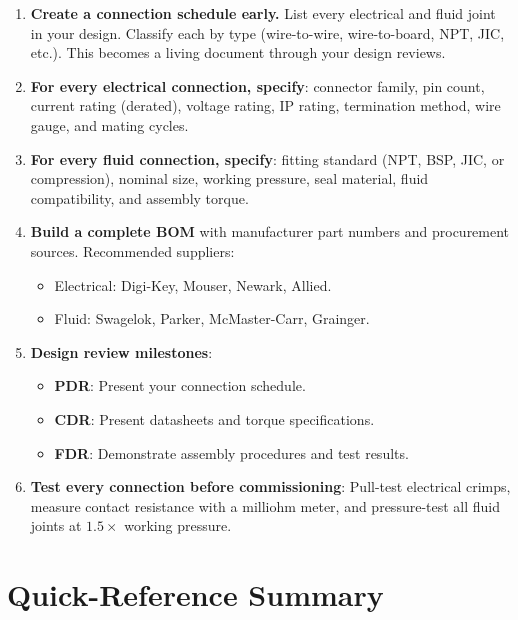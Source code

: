 \documentclass[11pt,letterpaper,twoside,openany]{book}
\begin{document}
\begin{enumerate}[leftmargin=1.5em]
  \item \textbf{Create a connection schedule early.} List every electrical and fluid joint in your design. Classify each by type (wire-to-wire, wire-to-board, NPT, JIC, etc.). This becomes a living document through your design reviews.

  \item \textbf{For every electrical connection, specify}: connector family, pin count, current rating (derated), voltage rating, IP rating, termination method, wire gauge, and mating cycles.

  \item \textbf{For every fluid connection, specify}: fitting standard (NPT, BSP, JIC, or compression), nominal size, working pressure, seal material, fluid compatibility, and assembly torque.

  \item \textbf{Build a complete BOM} with manufacturer part numbers and procurement sources. Recommended suppliers:
  \begin{itemize}[nosep]
    \item Electrical: Digi-Key, Mouser, Newark, Allied.
    \item Fluid: Swagelok, Parker, McMaster-Carr, Grainger.
  \end{itemize}

  \item \textbf{Design review milestones}:
  \begin{itemize}[nosep]
    \item \textbf{PDR}: Present your connection schedule.
    \item \textbf{CDR}: Present datasheets and torque specifications.
    \item \textbf{FDR}: Demonstrate assembly procedures and test results.
  \end{itemize}

  \item \textbf{Test every connection before commissioning}: Pull-test electrical crimps, measure contact resistance with a milliohm meter, and pressure-test all fluid joints at $1.5\times$ working pressure.
\end{enumerate}


\FloatBarrier
\section{Quick-Reference Summary}
\end{document}
